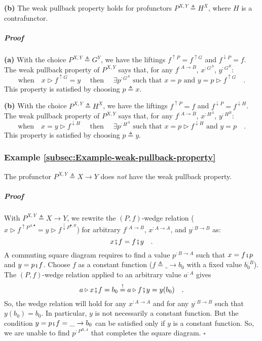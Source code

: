 \textbf{(b)} The weak pullback property holds for profunctors $P^{X,Y}\triangleq H^{X}$,
where $H$ is a contrafunctor.

\subparagraph{Proof}

\textbf{(a)} With the choice $P^{X,Y}\triangleq G^{Y}$, we have the
liftings $f^{\uparrow P}=f^{\uparrow G}$ and $f^{\downarrow P}=f$.
The weak pullback property of $P^{X,Y}$ says that, for any $f^{:A\rightarrow B}$,
$x^{:G^{A}}$, $y^{:G^{B}}$:
\[
\text{when}\quad x\triangleright f^{\uparrow G}=y\quad\text{ then }\quad\exists p^{:G^{A}}\text{ such that }x=p\text{ and }y=p\triangleright f^{\uparrow G}\quad.
\]
This property is satisfied by choosing $p\triangleq x$.

\textbf{(b)} With the choice $P^{X,Y}\triangleq H^{X}$, we have the
liftings $f^{\uparrow P}=f$ and $f^{\downarrow P}=f^{\downarrow H}$.
The weak pullback property of $P^{X,Y}$ says that, for any $f^{:A\rightarrow B}$,
$x^{:H^{A}}$, $y^{:H^{B}}$:
\[
\text{when}\quad x=y\triangleright f^{\downarrow H}\quad\text{ then }\quad\exists p^{:H^{A}}\text{ such that }x=p\triangleright f^{\downarrow H}\text{ and }y=p\quad.
\]
This property is satisfied by choosing $p\triangleq y$.

\subsubsection{Example \label{subsec:Example-weak-pullback-property}\ref{subsec:Example-weak-pullback-property}}

The profunctor $P^{X,Y}\triangleq X\rightarrow Y$ does \emph{not}
have the weak pullback property.

\subparagraph{Proof}

With $P^{X,Y}\triangleq X\rightarrow Y$, we rewrite the $\left(P,f\right)$-wedge
relation ($x\triangleright f^{\uparrow P^{A,\bullet}}=y\triangleright f^{\downarrow P^{\bullet,B}}$)
for arbitrary $f^{:A\rightarrow B}$, $x^{:A\rightarrow A}$, and
$y^{:B\rightarrow B}$ as:
\[
x\bef f=f\bef y\quad.
\]
A commuting square diagram requires to find a value $p^{:B\rightarrow A}$
such that $x=f\bef p$ and $y=p\bef f$. Choose $f$ as a constant
function ($f\triangleq\_\rightarrow b_{0}$ with a fixed value $b_{0}^{:B}$).
The $\left(P,f\right)$-wedge relation applied to an arbitrary value
$a^{:A}$ gives
\[
a\triangleright x\bef f=b_{0}\overset{!}{=}a\triangleright f\bef y=y(b_{0})\quad.
\]
So, the wedge relation will hold for any $x^{:A\rightarrow A}$ and
for any $y^{:B\rightarrow B}$ such that $y(b_{0})=b_{0}$. In particular,
$y$ is not necessarily a constant function. But the condition $y=p\bef f=\_\rightarrow b_{0}$
can be satisfied only if $y$ is a constant function. So, we are unable
to find $p^{:P^{B,A}}$ that completes the square diagram. $\square$

